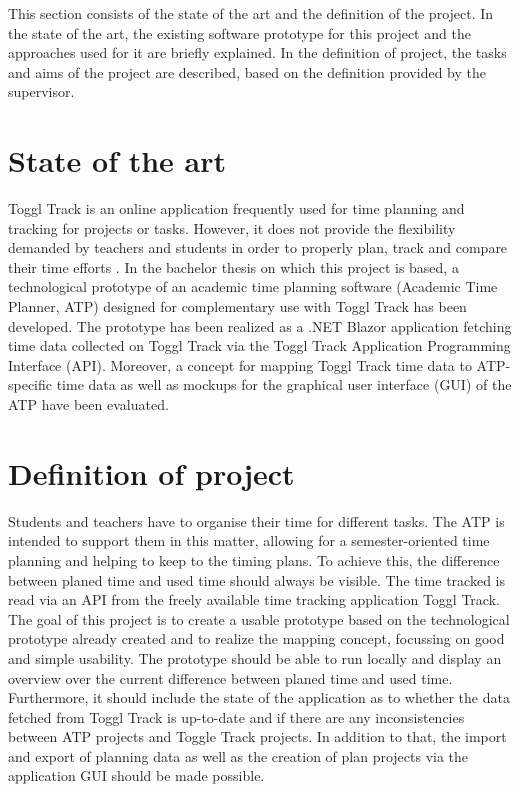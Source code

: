 
This section consists of the state of the art and the definition of the project. In the state of the art, the existing software prototype for this project and the approaches used for it are briefly explained. In the definition of project, the tasks and aims of the project are described, based on the definition provided by the supervisor.

\section{State of the art} \label{Initial position}
Toggl Track \cite{toggl_track_url} is an online application frequently used for time planning and tracking for projects or tasks. However, it does not provide the flexibility demanded by teachers and students in order to properly plan, track and compare their time efforts \cite{bachelorarbeit_Egger_Verstappen_page2}.
In the bachelor thesis on which this project is based, a technological prototype of an academic time planning software (Academic Time Planner, ATP) designed for complementary use with Toggl Track has been developed. The prototype has been realized as a .NET Blazor application fetching time data collected on Toggl Track via the Toggl Track Application Programming Interface (API). Moreover, a concept for mapping Toggl Track time data to ATP-specific time data as well as mockups for the graphical user interface (GUI) of the ATP have been evaluated.

\section{Definition of project}
Students and teachers have to organise their time for different tasks. The ATP is intended to support them in this matter, allowing for a semester-oriented time planning and helping to keep to the timing plans. To achieve this, the difference between planed time and used time should always be visible.
The time tracked is read via an API from the freely available time tracking application Toggl Track.
The goal of this project is to create a usable prototype based on the technological prototype already created and to realize the mapping concept, focussing on good and simple usability.
The prototype should be able to run locally and display an overview over the current difference between planed time and used time. Furthermore, it should include the state of the application as to whether the data fetched from Toggl Track is up-to-date and if there are any inconsistencies between ATP projects and Toggle Track projects. In addition to that, the import and export of planning data as well as the creation of plan projects via the application GUI should be made possible.
 


